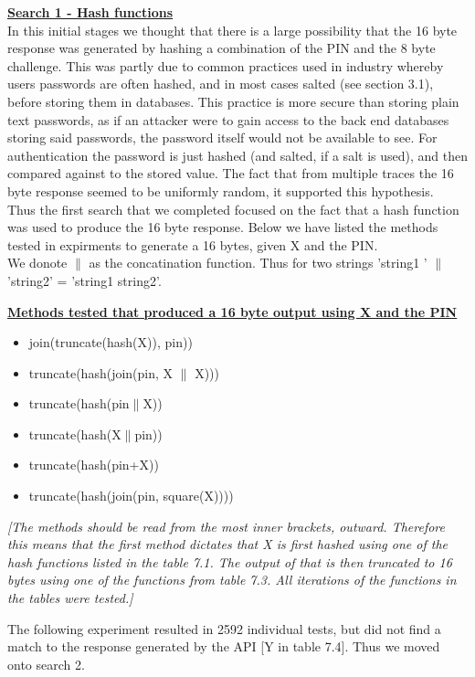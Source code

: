 \documentclass[bsc,frontabs,twoside,singlespacing,parskip,deptreport]{infthesis}     %
\begin{document}
\textbf{\underline{Search 1 - Hash functions}}\\
\noindent In this initial stages we thought that there is a large possibility that the 16 byte response was generated by hashing a combination of the PIN and the 8 byte challenge. This was partly due to common practices used in industry whereby users passwords are often hashed, and in most cases salted (see section 3.1), before storing them in databases. This practice is more secure than storing plain text passwords, as if an attacker were to gain access to the back end databases storing said passwords, the password itself would not be available to see. For authentication the password is just hashed (and salted, if a salt is used), and then compared against to the stored value. The fact that from multiple traces the 16 byte response seemed to be uniformly random, it supported this hypothesis.\\

Thus the first search that we completed focused on the fact that a hash function was used to produce the 16 byte response. Below we have listed the methods tested in expirments to generate a 16 bytes, given X and the PIN.\\

We donote $\|$ as the concatination function. Thus for two strings 'string1 ' $\|$ 'string2' = 'string1 string2'.

\textbf{\underline{Methods tested that produced a 16 byte output using X and the PIN}}
\begin{itemize}
\item join(truncate(hash(X)), pin))
\item truncate(hash(join(pin, X $\|$ X)))
\item truncate(hash(pin$\|$X))
\item truncate(hash(X$\|$pin))
\item truncate(hash(pin+X))
\item truncate(hash(join(pin, square(X))))
\end{itemize}

\textit{[The methods should be read from the most inner brackets, outward. Therefore this means that the first method dictates that X is first hashed using one of the hash functions listed in the table 7.1. The output of that is then truncated to 16 bytes using one of the functions from table 7.3. All iterations of the functions in the tables were tested.]}

The following experiment resulted in 2592 individual tests, but did not find a match to the response generated by the API [Y in table 7.4]. Thus we moved onto search 2.\\
\end{document}
